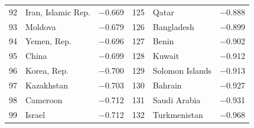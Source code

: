 \begin{tabular}{rlr|rlr}
92 & Iran, Islamic Rep. & $-$0.669 & 125 & Qatar & $-$0.888 \\
93 & Moldova & $-$0.679 & 126 & Bangladesh & $-$0.899 \\
94 & Yemen, Rep. & $-$0.696 & 127 & Benin & $-$0.902 \\
95 & China & $-$0.699 & 128 & Kuwait & $-$0.912 \\
96 & Korea, Rep. & $-$0.700 & 129 & Solomon Islands & $-$0.913 \\
97 & Kazakhstan & $-$0.703 & 130 & Bahrain & $-$0.927 \\
98 & Cameroon & $-$0.712 & 131 & Saudi Arabia & $-$0.931 \\
99 & Israel & $-$0.712 & 132 & Turkmenistan & $-$0.968 \\
\bottomrule
\end{tabular}
